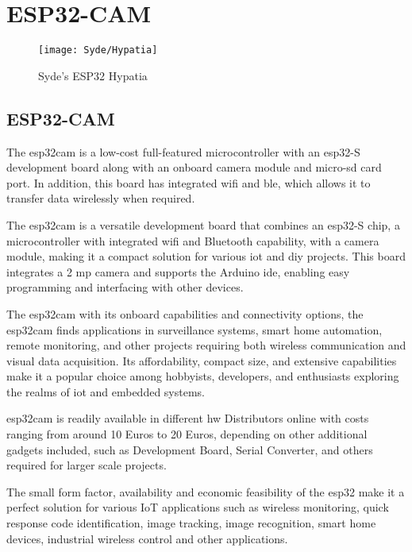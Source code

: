 

\chapter{ESP32-CAM}\label{ESP32description}


\begin{figure}
    \texttt{[image: Syde/Hypatia]}
    \caption{Syde's ESP32 Hypatia}
\end{figure}

\section{ESP32-CAM}\label{ESP32description}

The \ac{esp32cam} is a low-cost full-featured microcontroller with an \ac{esp32}-S development board along with an onboard camera module and micro-\ac{sd} card port. In addition, this board has integrated \ac{wifi} and \ac{ble}, which allows it to transfer data wirelessly when required.

\medskip

The \ac{esp32cam} is a versatile development board that combines an \ac{esp32}-S chip, a microcontroller with integrated \ac{wifi} and Bluetooth capability, with a camera module, making it a compact solution for various \ac{iot} and \ac{diy} projects. This board integrates a 2 \ac{mp} camera and supports the Arduino \ac{ide}, enabling easy programming and interfacing with other devices. 

\medskip

The \ac{esp32cam} with its onboard capabilities and connectivity options, the \ac{esp32cam} finds applications in surveillance systems, smart home automation, remote monitoring, and other projects requiring both wireless communication and visual data acquisition. Its affordability, compact size, and extensive capabilities make it a popular choice among hobbyists, developers, and enthusiasts exploring the realms of \ac{iot} and embedded systems.

\medskip

\ac{esp32cam} is readily available in different \ac{hw} Distributors online with costs ranging from around 10 Euros to 20 Euros, depending on other additional gadgets included, such as Development Board, Serial Converter, and others required for larger scale projects.

\medskip

The small form factor, availability and economic feasibility of the \ac{esp32} make it a perfect solution for various IoT applications such as wireless monitoring, quick response code identification, image tracking, image recognition, smart home devices, industrial wireless control and other applications.


